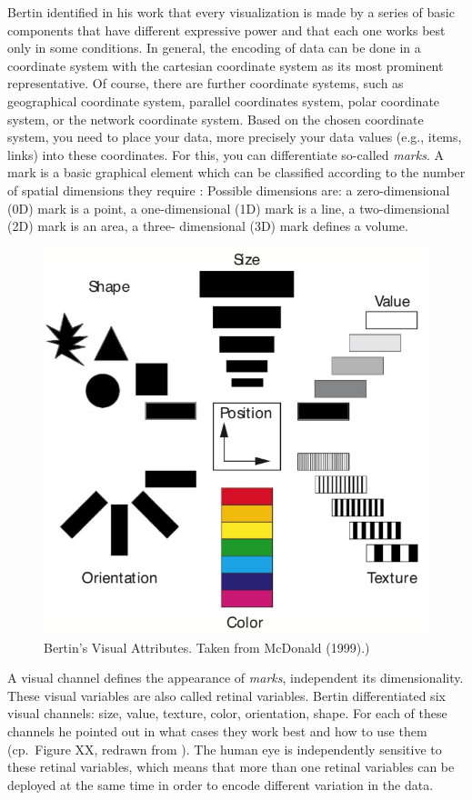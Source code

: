 \documentclass[
]{book}
\begin{document}
Bertin identified in his work that every visualization is made by a series of basic components that have different expressive power and that each one works best only in some conditions. In general, the encoding of data can be done in a coordinate system with the cartesian coordinate system as its most prominent representative. Of course, there are further coordinate systems, such as geographical coordinate system, parallel coordinates system, polar coordinate system, or the network coordinate system. Based on the chosen coordinate system, you need to place your data, more precisely your data values (e.g., items, links) into these coordinates. For this, you can differentiate so-called \emph{marks}. A mark is a basic graphical element which can be classified according to the number of spatial dimensions they require \citep{munzner2014visualization}: Possible dimensions are: a zero-dimensional (0D) mark is a point, a one-dimensional (1D) mark is a line, a two-dimensional (2D) mark is an area, a three- dimensional (3D) mark defines a volume.

\begin{figure}

{\centering \includegraphics[width=0.5\linewidth]{images/bertin_visualattributes} 

}

\caption{Bertin’s Visual Attributes. Taken from McDonald (1999).)}\label{fig:unnamed-chunk-9}
\end{figure}

A visual channel defines the appearance of \emph{marks}, independent its dimensionality. These visual variables are also called retinal variables. Bertin differentiated six visual channels: size, value, texture, color, orientation, shape. For each of these channels he pointed out in what cases they work best and how to use them (cp.~Figure XX, redrawn from \citep{MacDonald1999usingcolor}). The human eye is independently sensitive to these retinal variables, which means that more than one retinal variables can be deployed at the same time in order to encode different variation in the data.
\end{document}
